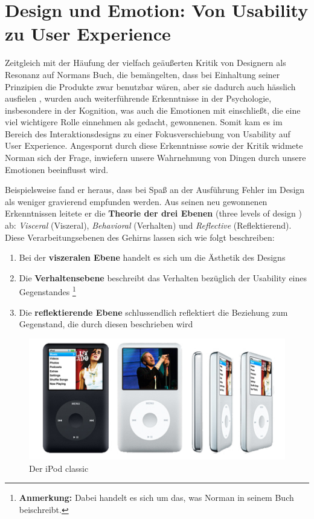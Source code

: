 \documentclass[parskip,headsepline, headtopline, %
footsepline, oneside, 12pt, headings=small]{scrreprt}
\newcommand{\setChapterQuote}[3]{\setchapterpreamble[o]{%
\dictum[#2 \emph{#3}]{\justifying {#1}}}}
\begin{document}
 
\chapter{Design und Emotion: Von Usability zu User Experience}

Zeitgleich mit der Häufung der vielfach geäußerten Kritik von Designern als Resonanz auf Normans Buch, die bemängelten, dass bei Einhaltung seiner Prinzipien die Produkte zwar benutzbar wären, aber sie dadurch auch hässlich ausfielen \cite[S. 8]{don2}, wurden auch weiterführende Erkenntnisse in der Psychologie, insbesondere in der Kognition, was auch die Emotionen mit einschließt, die eine viel wichtigere Rolle einnehmen als gedacht, gewonnenen. Somit kam es im Bereich des Interaktionsdesigns zu einer Fokusverschiebung von Usability auf User Experience. Angespornt durch diese Erkenntnisse sowie der Kritik widmete Norman sich der Frage, inwiefern unsere Wahrnehmung von Dingen durch unsere Emotionen beeinflusst wird.

Beispielsweise fand er heraus, dass bei Spaß an der Ausführung Fehler im Design als weniger gravierend empfunden werden.
Aus seinen neu gewonnenen Erkenntnissen leitete er die \textbf{Theorie der drei Ebenen} (three levels of design \cite[siehe Kapitel 3]{don2}) ab: \textit{Visceral} (Viszeral), \textit{Behavioral} (Verhalten) und \textit{Reflective} (Reflektierend). Diese Verarbeitungsebenen des Gehirns lassen sich wie folgt beschreiben:
\begin{enumerate}
\item Bei der \textbf{viszeralen Ebene} handelt es sich um die Ästhetik des Designs
\item Die \textbf{Verhaltensebene} beschreibt das Verhalten bezüglich der Usability eines Gegenstandes \footnote{\textbf{Anmerkung:} Dabei handelt es sich um das, was Norman in seinem Buch \cite{don} beischreibt.}
\item Die \textbf{reflektierende Ebene} schlussendlich reflektiert die Beziehung zum Gegenstand, die durch diesen beschrieben wird
\end{enumerate}

\begin{figure}
\center
\includegraphics[width=.7\textwidth]{images/ipod-classic}
\caption{Der iPod classic}
\label{fig:ipod}
\end{figure}
\end{document}
